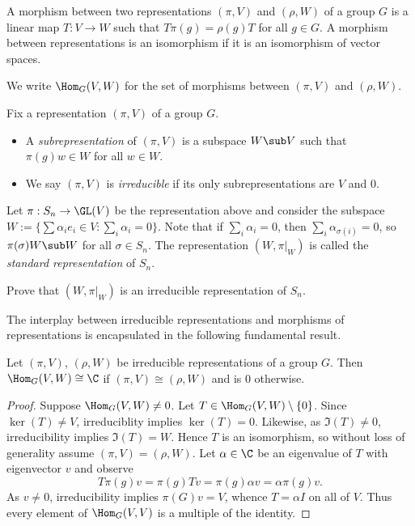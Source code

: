 \documentclass[../main.tex]{subfiles}
\begin{document}
\begin{definition}
    A morphism between two representations $ (\pi, V) $ and $ (\rho, W) $ of a group $ G $ is a linear map $ T:V\to W $ such that $ T \pi(g) = \rho(g) T $ for all $ g\in G $. A morphism between representations is an isomorphism if it is an isomorphism of vector spaces.

    We write $ \Hom_{G}(V,W) $ for the set of morphisms between $ (\pi,V) $ and $ (\rho,W) $.
\end{definition}

\begin{definition} Fix a representation $ (\pi,V) $ of a group $ G $.
    \begin{itemize}
        \item  A \textit{subrepresentation} of $ (\pi,V) $ is a subspace $ W\sub V $ such that $ \pi(g)w\in W $ for all $ w\in W $.
        \item We say $ (\pi,V) $ is \textit{irreducible} if its only subrepresentations are $ V $ and $ 0 $.
    \end{itemize}
\end{definition}

\begin{example}
    Let $ \pi:S_{n}\to \GL(V) $ be the representation above and consider the subspace $ W:= \{\sum \alpha_{i}e_{i}\in V : \sum_{i}\alpha_{i} = 0\} $. Note that if $ \sum_{i} \alpha_{i} = 0 $, then $ \sum_{i} \alpha_{\sigma(i)} = 0 $, so $ \pi(\sigma)W\sub W $ for all $ \sigma\in S_{n} $. The representation $ (W, \pi\vert_{W}) $ is called the \textit{standard representation} of $ S_{n} $.
\end{example}

\begin{exercise}
    Prove that $ (W, \pi\vert_{W}) $ is an irreducible representation of $ S_{n} $.
\end{exercise}

The interplay between irreducible representations and morphisms of representations is encapsulated in the following fundamental result.

\begin{lemma}
    Let $ (\pi,V) $, $ (\rho,W) $ be irreducible representations of a group $ G $. Then $ \Hom_{G}(V,W)\cong\C $ if $ (\pi,V)\cong (\rho,W) $ and is $ 0 $ otherwise.
\end{lemma}

\begin{proof}
    Suppose $ \Hom_{G}(V,W)\neq 0 $. Let $ T\in \Hom_{G}(V,W)\setminus\{0\} $. Since $ \ker(T)\neq V $, irreduciblity implies $ \ker(T) = 0 $. Likewise, as $ \Im(T) \neq 0 $, irreducibility implies $ \Im(T) = W $. Hence $ T $ is an isomorphism, so without loss of generality assume $ (\pi,V) = (\rho,W) $. Let $ \alpha\in \C $ be an eigenvalue of $ T $ with eigenvector $ v $ and observe
    \[
        T \pi(g) v = \pi(g) T v = \pi(g) \alpha v = \alpha\pi(g) v.
    \]
    As $ v\neq 0 $, irreducibility implies $ \pi(G)v = V$, whence $ T = \alpha I $ on all of $ V $. Thus every element of $ \Hom_{G}(V,V) $ is a multiple of the identity.
\end{proof}
\end{document}
